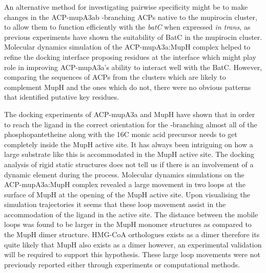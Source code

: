 	An alternative method for investigating pairwise specificity might be to make changes in the ACP-mupA3ab \bet-branching ACPs native to the mupirocin cluster, to allow them to function efficiently with the \textit{batC} when expressed \textit{in trans}, as previous experiments have shown the suitability of BatC in the mupirocin cluster. Molecular dynamics simulation of the ACP-mupA3a:MupH complex helped to refine the docking interface proposing residues at the interface which might play role in improving ACP-mupA3a's ability to interact well with the BatC. However, comparing the sequences of ACPs from the clusters which are likely to complement MupH and the ones which do not, there were no obvious patterns that identified putative key residues. 
	
	The docking experiments of ACP-mupA3a and MupH have shown that in order to reach the ligand in the correct orientation for the \bet-branching almost all of the phosphopantetheine along with the 16C monic acid precursor needs to get completely inside the MupH active site.  It has always been intriguing on how a large substrate like this is accommodated in the MupH active site. The docking analysis of rigid static structures does not tell us if there is an involvement of a dynamic element during the process. Molecular dynamics simulations on the ACP-mupA3a:MupH complex revealed a large movement in two loops at the surface of MupH at the opening of the MupH active site. Upon visualising the simulation trajectories it seems that these loop movement assist in the accommodation of the ligand in the active site. The distance between the mobile loops was found to be larger in the MupH monomer structures as compared to the MupH dimer structure. HMG-CoA orthologues exists as a dimer therefore its quite likely that MupH also exists as a dimer however, an experimental validation will be required to support this hypothesis. These large loop movements were not previously reported either through experiments or computational methods.
	
